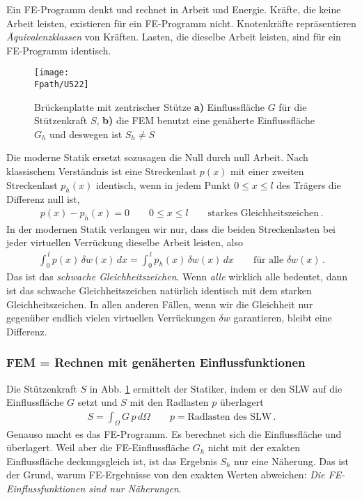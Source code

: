 Ein FE-Programm denkt und rechnet in Arbeit und Energie. Kr\"{a}fte, die keine Arbeit leisten, existieren f\"{u}r ein FE-Programm nicht. Knotenkr\"{a}fte repr\"{a}sentieren {\em \"{A}quivalenzklassen\/} von Kr\"{a}ften. Lasten, die dieselbe Arbeit leisten, sind f\"{u}r ein FE-Programm identisch.
\begin{figure}[tbp] \centering
\if {} \sidecaption \fi
\texttt{[image: \\Fpath/U522]}
\caption{Br\"{u}ckenplatte mit zentrischer St\"{u}tze \textbf{ a)} Einflussfl\"{a}che $G$ f\"{u}r die St\"{u}tzenkraft $S$, \textbf{ b)} die FEM benutzt eine gen\"{a}herte Einflussfl\"{a}che $G_h$ und deswegen ist $S_h \neq S$} \label{U522}
\end{figure}%

Die moderne Statik ersetzt sozusagen die Null durch null Arbeit. Nach klassischem Verst\"{a}ndnis ist eine Streckenlast $p(x)$ mit einer zweiten Streckenlast $p_h(x)$ identisch, wenn in jedem Punkt $0 \leq x \leq l$ des Tr\"{a}gers die Differenz null ist,
\begin{align}
p(x) - p_h(x) = 0 \qquad 0 \leq x \leq l \qquad \mbox{starkes Gleichheitszeichen}\,.
\end{align}
In der modernen Statik verlangen wir nur, dass die beiden Streckenlasten bei jeder virtuellen Verr\"{u}ckung
dieselbe Arbeit leisten, also
\begin{align}
\int_0^{\,l} p(x) \,\delta w(x)\,dx = \int_0^{\,l} p_h(x) \,\delta w(x)\,dx   \qquad
\mbox{f\"{u}r alle $\delta w(x)$}\,.
\end{align}
Das ist das {\em schwache Gleichheitszeichen\/}. Wenn {\em alle\/} wirklich alle bedeutet, dann ist das schwache Gleichheitszeichen nat\"{u}rlich identisch mit dem starken Gleichheitszeichen. In allen anderen F\"{a}llen, wenn wir die Gleichheit nur gegen\"{u}ber endlich vielen virtuellen Verr\"{u}ckungen $\delta w$ garantieren, bleibt eine Differenz.\\

{\textcolor{sectionTitleBlue}{\subsubsection*{FEM = Rechnen mit gen\"{a}herten Einflussfunktionen}}}

Die St\"{u}tzenkraft $S$ in Abb. \ref{U522} ermittelt der Statiker, indem er den SLW auf die Einflussfl\"{a}che $G$ setzt und  $S$ mit den Radlasten $p$ \"{u}berlagert
\begin{align}\label{Eq2}
S = \int_{\Omega} G\,p\,d\Omega \qquad p = \text{Radlasten des SLW}\,.
\end{align}
Genauso macht es das FE-Programm. Es berechnet sich die Einflussfl\"{a}che und \"{u}berlagert. Weil aber die FE-Einflussfl\"{a}che $G_h$ nicht mit der exakten Einflussfl\"{a}che deckungsgleich ist, ist das Ergebnis $S_h$ nur eine N\"{a}herung. Das ist der Grund, warum FE-Ergebnisse von den exakten Werten abweichen: {\em Die FE-Einflussfunktionen sind nur N\"{a}herungen\/}.

